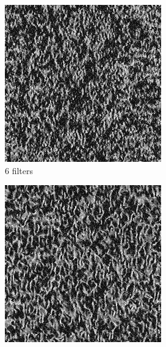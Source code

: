 \documentclass[11pt, oneside]{article}   	%
\begin{document}
\begin{figure}[H]
    \begin{subfigure}[b]{0.3\textwidth}
        \includegraphics[width=\textwidth]{grass6}
        \caption{6 filters}
        \label{fig:grass6}
    \end{subfigure}
    \begin{subfigure}[b]{0.3\textwidth}
        \includegraphics[width=\textwidth]{grass12}

\end{subfigure}
\end{figure}
\end{document}
